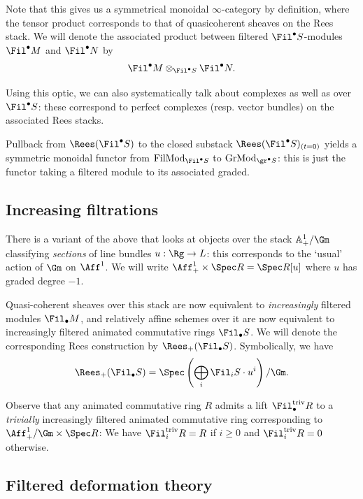\documentclass[10pt]{amsart}
\begin{document}
Note that this gives us a symmetrical monoidal $\infty$-category by definition, where the tensor product corresponds to that of quasicoherent sheaves on the Rees stack. We will denote the associated product between filtered $\Fil^\bullet S$-modules $\Fil^\bullet M$ and $\Fil^\bullet N$ by
\[
\Fil^\bullet M\otimes_{\Fil^\bullet S}\Fil^\bullet N.
\]

Using this optic, we can also systematically talk about  complexes as well as  over $\Fil^\bullet S$: these correspond to perfect complexes (resp. vector bundles) on the associated Rees stacks.

Pullback from $\Rees(\Fil^\bullet S)$ to the closed substack $\Rees(\Fil^\bullet S)_{(t=0)}$ yields a symmetric monoidal functor from $\mathrm{FilMod}_{\Fil^\bullet S}$ to $\mathrm{GrMod}_{\gr^\bullet S}$: this is just the functor taking a filtered module to its associated graded.



\subsection{Increasing filtrations}

There is a variant of the above that looks at objects over the stack $\mathbb{A}^1_+/\Gm$ classifying \emph{sections} of line bundles $u:\Rg\to L$: this corresponds to the `usual' action of $\Gm$ on $\Aff^1$. We will write $\Aff^1_+\times\Spec R = \Spec R[u]$ where $u$ has graded degree $-1$.

Quasi-coherent sheaves over this stack are now equivalent to \emph{increasingly} filtered modules $\Fil_\bullet M$, and relatively affine schemes over it are now equivalent to increasingly filtered animated commutative rings $\Fil_\bullet S$. We will denote the corresponding Rees construction by $\Rees_+(\Fil_\bullet S)$. Symbolically, we have
\[
\Rees_+(\Fil_\bullet S) = \Spec\left(\bigoplus_i\Fil_iS\cdot u^i\right)/\Gm.
\]

Observe that any animated commutative ring $R$ admits a lift $\Fil^{\mathrm{triv}}_{\bullet} R$ to a \emph{trivially} increasingly filtered animated commutative ring corresponding to $\Aff^1_+/\Gm\times\Spec R$: We have $\Fil^{\mathrm{triv}}_{i}R = R$ if $i\ge 0$ and $\Fil^{\mathrm{triv}}_iR = 0$ otherwise.

\subsection{Filtered deformation theory}
\label{subsec:filtered_square-zero}
\end{document}
